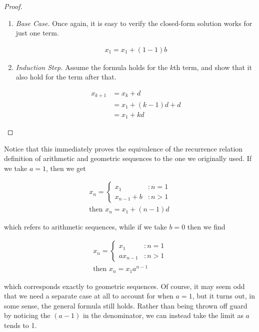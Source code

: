 \documentclass[twoside]{report}
\begin{document}
\begin{proof}
	\begin{enumerate}
		\item \emph{Base Case.} Once again, it is easy to verify the closed-form solution works for just one term.
		
		\begin{align*}
			x_1 = x_1 + (1 - 1)b
		\end{align*}
		
		\item \emph{Induction Step.} Assume the formula holds for the $k$th term, and show that it also hold for the term after that.
		
		\begin{align*}
			x_{k + 1} &= x_{k} + d \\
			&= x_1 + (k - 1)d + d \\
			&= x_1 + kd
		\end{align*}
	\end{enumerate}
\end{proof}
\vspace{\baselineskip}

Notice that this immediately proves the equivalence of the recurrence relation definition of arithmetic and geometric sequences to the one we originally used. If we take $a = 1$, then we get

\begin{align*}
	x_n =
	\begin{cases}
		x_1 &: n = 1 \\
		x_{n - 1} + b &: n > 1
	\end{cases} \\
	\text{then } x_n = x_1 + (n - 1) d
\end{align*}

which refers to arithmetic sequences, while if we take $b = 0$ then we find

\begin{align*}
	x_n =
	\begin{cases}
		x_1 &: n = 1 \\
		ax_{n - 1} &: n > 1
	\end{cases} \\
	\text{then } x_n = x_1 a^{n - 1}
\end{align*}

which corresponds exactly to geometric sequences. Of course, it may seem odd that we need a separate case at all to account for when $a = 1$, but it turns out, in some sense, the general formula still holds. Rather than being thrown off guard by noticing the $(a - 1)$ in the denominator, we can instead take the limit as $a$ tends to 1.
\end{document}
